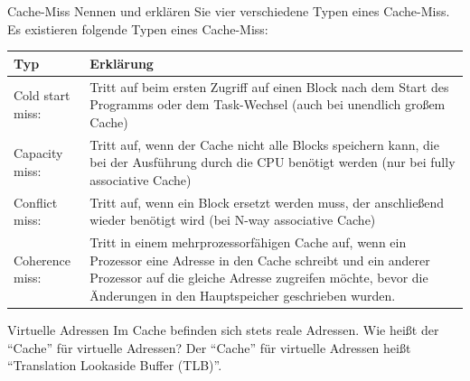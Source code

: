 \begin{aufgabe}[Cache]{Cache-Miss}
  Nennen und erklären Sie vier verschiedene Typen eines Cache-Miss.
  \tcblower
  Es existieren folgende Typen eines Cache-Miss:\\
  \begin{tabularx}{\textwidth}{|l|X|}
    \toprule
    Typ              & Erklärung                                                                                                                                          \\
    \midrule
    Cold start miss: & Tritt auf beim ersten Zugriff auf einen Block nach dem Start des Programms oder dem Task-Wechsel (auch bei unendlich großem Cache)                 \\
    \midrule
    Capacity miss:   & Tritt auf, wenn der Cache nicht alle Blocks speichern kann, die bei der Ausführung durch die CPU benötigt werden (nur bei fully associative Cache) \\
    \midrule
    Conflict miss:   & Tritt auf, wenn ein Block ersetzt werden muss, der anschließend wieder benötigt wird (bei N-way associative Cache)                                 \\
    \midrule
    Coherence miss:  & Tritt in einem mehrprozessorfähigen Cache auf,
    wenn ein Prozessor eine Adresse in den Cache schreibt und ein anderer Prozessor auf die gleiche Adresse zugreifen möchte,
    bevor die Änderungen in den Hauptspeicher geschrieben wurden.                                                                                                         \\
    \bottomrule
  \end{tabularx}
\end{aufgabe}

\begin{aufgabe}[Cache]{Virtuelle Adressen}
  Im Cache befinden sich stets reale Adressen.
  Wie heißt der \enquote{Cache} für virtuelle Adressen?
  \tcblower
  Der \enquote{Cache} für virtuelle Adressen heißt \enquote{Translation Lookaside Buffer (TLB)}.
\end{aufgabe}

